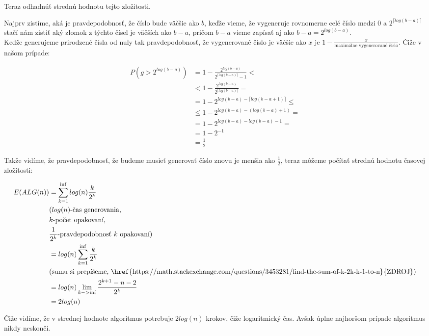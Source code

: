 \documentclass[a4paper]{article}
\begin{document}
Teraz odhadnúť strednú hodnotu tejto zložitosti. 

Najprv zistíme, aká je pravdepodobnosť, že číslo bude väčšie ako $b$, keďže vieme, že vygeneruje rovnomerne celé číslo medzi $0$ a $2^{\lceil log(b-a) \rceil}$ stačí nám zistiť aký zlomok z týchto čísel je väčších ako $b-a$, pričom $b-a$ vieme zapísať aj ako $b-a=2^{log(b-a)}$. 
\\

Keďže generujeme prirodzené čísla od nuly tak pravdepodobnosť, že vygenerované číslo je väčšie ako $x$ je $1-\frac{x}{\text{maximálne vygenerované číslo}}$. Čiže v našom prípade:

\begin{align*}
	P(g>2^{log(b-a)}) &= 1-\frac{2^{log(b-a)}}{2^{\lceil log(b-a) \rceil}-1} < \\
	&<1-\frac{2^{log(b-a)}}{2^{\lceil log(b-a) \rceil}} =\\
	&=1- 2^{log(b-a) - \lceil log(b-a+1) \rceil} \leq \\
	&\leq 1- 2^{log(b-a) - (log(b-a) + 1)} = \\
	&=1- 2^{log(b-a) - log(b-a) - 1} = \\
	&=1- 2^{-1} \\
	&= \frac{1}{2}
\end{align*}
\newpage

Takže vidíme, že pravdepodobnosť, že budeme musieť generovať číslo znovu je menšia ako $\frac{1}{2}$, teraz môžeme počítať strednú hodnotu časovej zložitosti:

\begin{align*}
	E(ALG(n)) &= \sum_{k=1}^{\inf} log(n)\frac{k}{2^k}\\
	&\text{($log(n)$-čas generovania,} \\
	&\text{$k$-počet opakovaní,}\\
	&\text{$\frac{1}{2^k}$-pravdepodobnosť $k$ opakovaní)}\\
	&= log(n)\sum_{k=1}^{\inf} \frac{k}{2^k}\\
	&\text{(sumu si prepíšeme, \href{https://math.stackexchange.com/questions/3453281/find-the-sum-of-k-2k-k-1-to-n}{ZDROJ})} \\
	&= log(n)\lim_{k->\inf} \frac{2^{k+1}-n-2}{2^k}\\
	&= 2log(n)\\
\end{align*}

Čiže vidíme, že v strednej hodnote algoritmus potrebuje $2log(n)$ krokov, čiže logaritmický čas. Avšak úplne najhoršom prípade algoritmus nikdy neskončí.
\\
\end{document}

